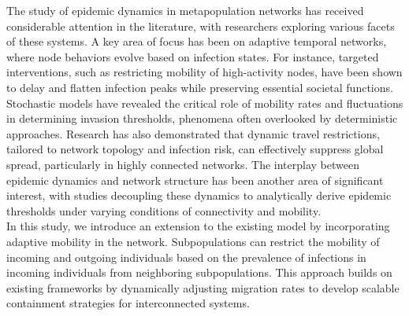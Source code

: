 The study of epidemic dynamics in metapopulation networks has received considerable attention in the literature, with researchers exploring various facets of these systems. A key area of focus has been on adaptive temporal networks, where node behaviors evolve based on infection states. For instance, targeted interventions, such as restricting mobility of high-activity nodes, have been shown to delay and flatten infection peaks while preserving essential societal functions.\cite{mancastroppa2024preserving} Stochastic models have revealed the critical role of mobility rates and fluctuations in determining invasion thresholds, phenomena often overlooked by deterministic approaches.\cite{matamalas2018effective} Research has also demonstrated that dynamic travel restrictions, tailored to network topology and infection risk, can effectively suppress global spread, particularly in highly connected networks.\cite{hufnagel2004forecast} The interplay between epidemic dynamics and network structure has been another area of significant interest, with studies decoupling these dynamics to analytically derive epidemic thresholds under varying conditions of connectivity and mobility.\cite{kuehn2022influence}\\

In this study, we introduce an extension to the existing model by incorporating adaptive mobility in the network. Subpopulations can restrict the mobility of incoming and outgoing individuals based on the prevalence of infections in incoming individuals from neighboring subpopulations. This approach builds on existing frameworks by dynamically adjusting migration rates to develop scalable containment strategies for interconnected systems.

% 